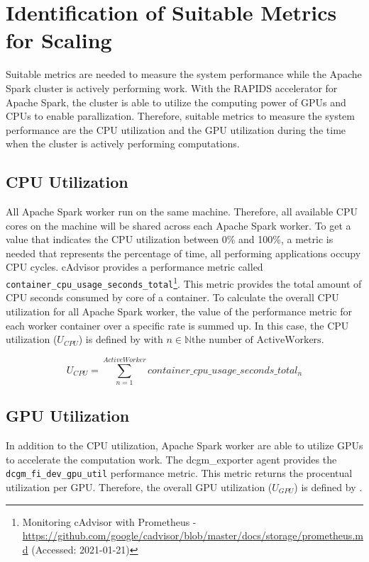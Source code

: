 \section{Identification of Suitable Metrics for Scaling}
\label{sec:05_metrics}
Suitable metrics are needed to measure the system performance while the Apache Spark cluster is actively performing work.
With the RAPIDS accelerator for Apache Spark, the cluster is able to utilize the computing power of GPUs and CPUs to enable parallization.
Therefore, suitable metrics to measure the system performance are the CPU utilization and the GPU utilization during the time when the cluster is actively performing computations.


\subsection{CPU Utilization}
All Apache Spark worker run on the same machine. Therefore, all available CPU cores on the machine will be shared across each Apache Spark worker.
%
To get a value that indicates the CPU utilization between 0\% and 100\%, a metric is needed that represents the percentage of time, all performing applications occupy CPU cycles.
cAdvisor provides a performance metric called \texttt{container\_cpu\_usage\_seconds\_total}\footnote{Monitoring cAdvisor with Prometheus - \url{https://github.com/google/cadvisor/blob/master/docs/storage/prometheus.md} (Accessed: 2021-01-21)}. This metric provides the total amount of CPU seconds consumed by core of a container. 
To calculate the overall CPU utilization for all Apache Spark worker, the value of the performance metric for each worker container over a specific rate is summed up.
%
In this case, the CPU utilization ($U_{CPU}$) is defined by  with $n \in \mathbb{N} \text{the number of ActiveWorkers}$.

\begin{equation}
U_{CPU}=\sum_{n=1}^{ActiveWorker}container\_cpu\_usage\_seconds\_total_{n}
\label{eq:05_metrics_cpu}
\end{equation}

\subsection{GPU Utilization}
%
In addition to the CPU utilization, Apache Spark worker are able to utilize GPUs to accelerate the computation work.	
The dcgm\_exporter agent provides the \texttt{dcgm\_fi\_dev\_gpu\_util} performance metric. This metric returns the procentual utilization per GPU.
Therefore, the overall GPU utilization ($U_{GPU}$) is defined by .


